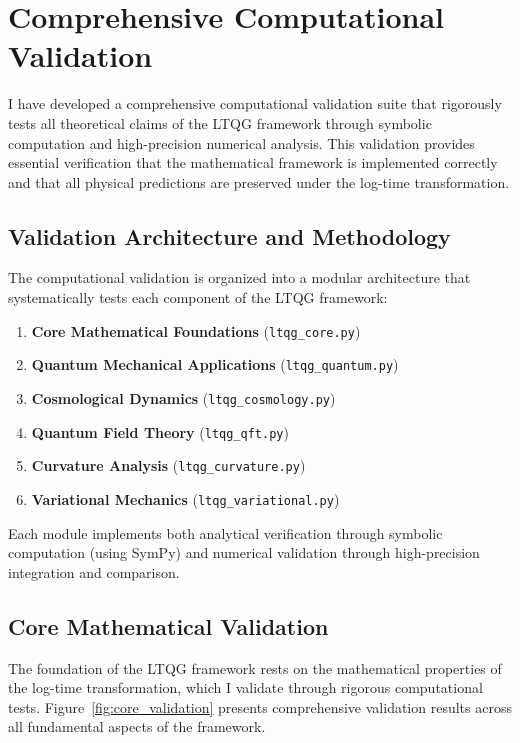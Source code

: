 \section{Comprehensive Computational Validation}
\label{sec:computational_validation}

I have developed a comprehensive computational validation suite that rigorously tests all theoretical claims of the LTQG framework through symbolic computation and high-precision numerical analysis. This validation provides essential verification that the mathematical framework is implemented correctly and that all physical predictions are preserved under the log-time transformation.

\subsection{Validation Architecture and Methodology}
\label{subsec:validation_architecture}

The computational validation is organized into a modular architecture that systematically tests each component of the LTQG framework:

\begin{enumerate}
\item \textbf{Core Mathematical Foundations} (\texttt{ltqg\_core.py})
\item \textbf{Quantum Mechanical Applications} (\texttt{ltqg\_quantum.py})
\item \textbf{Cosmological Dynamics} (\texttt{ltqg\_cosmology.py})
\item \textbf{Quantum Field Theory} (\texttt{ltqg\_qft.py})
\item \textbf{Curvature Analysis} (\texttt{ltqg\_curvature.py})
\item \textbf{Variational Mechanics} (\texttt{ltqg\_variational.py})
\end{enumerate}

Each module implements both analytical verification through symbolic computation (using SymPy) and numerical validation through high-precision integration and comparison.

\subsection{Core Mathematical Validation}
\label{subsec:core_mathematical_validation}

The foundation of the LTQG framework rests on the mathematical properties of the log-time transformation, which I validate through rigorous computational tests. Figure~\ref{fig:core_validation} presents comprehensive validation results across all fundamental aspects of the framework.


